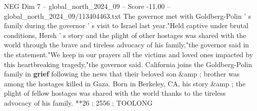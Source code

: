 \begin{textsample}{NEG Dim 7 – global\_north\_2024\_09 – Score -11.00 – global\_north\_2024\_09/113404463.txt}
The governor met with Goldberg-Polin ' s family during the governor ' s visit to Israel last year."Held captive under brutal conditions, Hersh ' s story and the plight of other hostages was shared with the world through the brave and tireless advocacy of his family,"the governor said in the statement."We keep in our prayers all the victims and loved ones impacted by this heartbreaking tragedy,"the governor said.
California joins the Goldberg-Polin family in \textbf{grief} following the news that their beloved son \&amp ; brother was among the hostages killed in Gaza.
Born in Berkeley, CA, his story \&amp ; the plight of fellow hostages was shared with the world thanks to the tireless advocacy of his family. **26 ; 2556 ; TOOLONG

\end{textsample}
